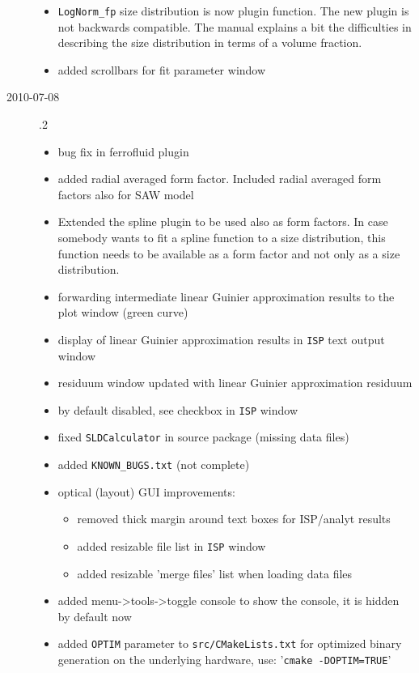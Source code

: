 \begin{description}
\begin{itemize}
        \item \texttt{LogNorm\_fp} size distribution is now plugin function.
            The new plugin is not backwards compatible.
            The manual explains a bit the difficulties in describing the size distribution
            in terms of a volume fraction.
        \item added scrollbars for fit parameter window
        \end{itemize}
    \item[2010-07-08] .2
        \begin{itemize}
        \item bug fix in ferrofluid plugin
        \item added radial averaged form factor. Included radial averaged form factors also for SAW model
        \item Extended the spline plugin to be used also as form factors. In case somebody wants to fit a spline function to a size distribution, this function needs to be available as a form factor and not only as a size distribution.
        \item forwarding intermediate linear Guinier approximation results to the plot window (green curve)
        \item display of linear Guinier approximation results in \texttt{ISP} text output window
        \item residuum window updated with linear Guinier approximation residuum
        \item by default disabled, see checkbox in \texttt{ISP} window
        \item fixed \texttt{SLDCalculator} in source package (missing data files)
        \item added \texttt{KNOWN\_BUGS.txt} (not complete)
        \item optical (layout) GUI improvements:
            \begin{itemize}
            \item removed thick margin around text boxes for ISP/analyt results
            \item added resizable file list in \texttt{ISP} window
            \item added resizable 'merge files' list when loading data files
            \end{itemize}
        \item added menu->tools->toggle console to show the console, it is hidden by default now
        \item added \texttt{OPTIM} parameter to \texttt{src/CMakeLists.txt} for optimized binary generation on the underlying hardware, use: '\texttt{cmake -DOPTIM=TRUE}'

\end{itemize}
\end{description}
